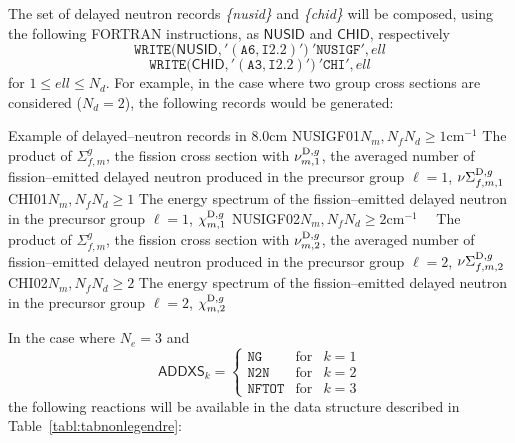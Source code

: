 The set of delayed neutron records {\sl \{nusid\}} and {\sl \{chid\}} will be
composed, using the following FORTRAN instructions, as $\mathsf{NUSID}$ and $\mathsf{CHID}$,
respectively
  \begin{displaymath}
    \mathtt{WRITE(}\mathsf{NUSID}\mathtt{,'(A6,I2.2)')} \ \mathtt{'NUSIGF'},ell
  \end{displaymath}
  \begin{displaymath}
    \mathtt{WRITE(}\mathsf{CHID}\mathtt{,'(A3,I2.2)')} \ \mathtt{'CHI'},ell
  \end{displaymath}
for $1\leq ell \leq N_d$. For example, in the case where two group cross sections are considered
($N_d=2$), the following records would be generated:

\begin{DescriptionEnregistrement}{Example of delayed--neutron records in
}{8.0cm}
\OptRealEnr
  {NUSIGF01}{$N_{m},N_{f}$}{$N_{d}\ge 1$}{cm$^{-1}$} 
  {The product of $\Sigma_{f,m}^{g}$, the fission cross section with
   $\nu_{m,1}^{{\rm D},g}$, the averaged number of fission--emitted delayed
   neutron produced in the precursor group $\ell=1$,
   $\nu\Sigma_{f,m,1}^{{\rm D},g}$}
\OptRealEnr
  {CHI01}{$N_{m},N_{f}$}{$N_{d}\ge 1$}{}
  {The energy spectrum of the fission--emitted delayed neutron
  in the precursor group $\ell=1$, $\chi_{m,1}^{{\rm D},g}$}
\OptRealEnr
  {NUSIGF02}{$N_{m},N_{f}$}{$N_{d}\ge 2$}{cm$^{-1}$~~} 
  {The product of $\Sigma_{f,m}^{g}$, the fission cross section with
   $\nu_{m,2}^{{\rm D},g}$, the averaged number of fission--emitted delayed
   neutron produced in the precursor group $\ell=2$,
   $\nu\Sigma_{f,m,2}^{{\rm D},g}$}
\OptRealEnr
  {CHI02}{$N_{m},N_{f}$}{$N_{d}\ge 2$}{}
  {The energy spectrum of the fission--emitted delayed neutron
  in the precursor group $\ell=2$, $\chi_{m,2}^{{\rm D},g}$}
\end{DescriptionEnregistrement}

\vskip 0.2cm

In the case where $N_{e}=3$ and
\begin{displaymath}
\mathsf{ADDXS}_{k} = \left\{
\begin{array}{lll}
\mathtt{NG} & \textrm{for} & k=1\\
\mathtt{N2N}& \textrm{for} & k=2\\
\mathtt{NFTOT}& \textrm{for} & k=3
\end{array} \right.
\end{displaymath}
the following reactions will be available in the data structure described
in Table~\ref{tabl:tabnonlegendre}:

